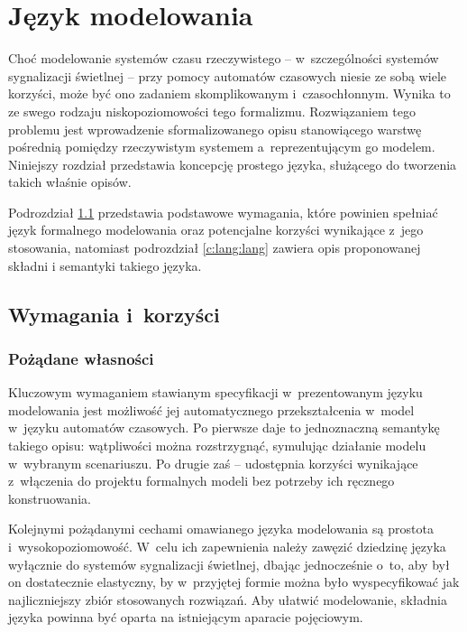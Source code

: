 \documentclass{pracamgr}
\newcommand{\upp}{\textsc{Uppaal}}
\theoremstyle{plain}
\begin{document}

\chapter{Język modelowania}

Choć modelowanie systemów czasu rzeczywistego -- w~szczególności
systemów sygnalizacji świetlnej -- przy pomocy automatów czasowych
niesie ze sobą wiele korzyści, może być ono zadaniem skomplikowanym
i~czasochłonnym. Wynika to ze swego rodzaju niskopoziomowości tego
formalizmu. Rozwiązaniem tego problemu jest wprowadzenie
sformalizowanego opisu stanowiącego warstwę pośrednią pomiędzy
rzeczywistym systemem a~reprezentującym go modelem.  Niniejszy
rozdział przedstawia koncepcję prostego języka, służącego do tworzenia
takich właśnie opisów.

Podrozdział \ref{c:lang:req} przedstawia podstawowe wymagania, które
powinien spełniać język formalnego modelowania oraz potencjalne
korzyści wynikające z~jego stosowania, natomiast podrozdział
\ref{c:lang:lang} zawiera opis proponowanej składni i semantyki
takiego języka.

\section{Wymagania i~korzyści}
\label{c:lang:req}

\subsection{Pożądane własności}

Kluczowym wymaganiem stawianym specyfikacji w~prezentowanym języku
modelowania jest możliwość jej automatycznego przekształcenia w~model
w~języku automatów czasowych. Po pierwsze daje to jednoznaczną
semantykę takiego opisu: wątpliwości można rozstrzygnąć, symulując
działanie modelu w~wybranym scenariuszu. Po drugie zaś -- udostępnia
korzyści wynikające z~włączenia do projektu formalnych modeli bez
potrzeby ich ręcznego konstruowania.

Kolejnymi pożądanymi cechami omawianego języka modelowania są prostota
i~wysokopoziomowość. W~celu ich zapewnienia należy zawęzić dziedzinę
języka wyłącznie do systemów sygnalizacji świetlnej, dbając
jednocześnie o~to, aby był on dostatecznie elastyczny, by w~przyjętej
formie można było wyspecyfikować jak najliczniejszy zbiór stosowanych
rozwiązań. Aby ułatwić modelowanie, składnia języka powinna być oparta
na istniejącym aparacie pojęciowym.
\end{document}
